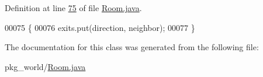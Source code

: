 Definition at line \hyperlink{Room_8java_source_l00075}{75} of file \hyperlink{Room_8java_source}{Room.\-java}.


\begin{DoxyCode}
00075                                                          \{
00076         exits.put(direction, neighbor);
00077     \}
\end{DoxyCode}


The documentation for this class was generated from the following file\-:\begin{DoxyCompactItemize}
\item 
pkg\-\_\-world/\hyperlink{Room_8java}{Room.\-java}\end{DoxyCompactItemize}
